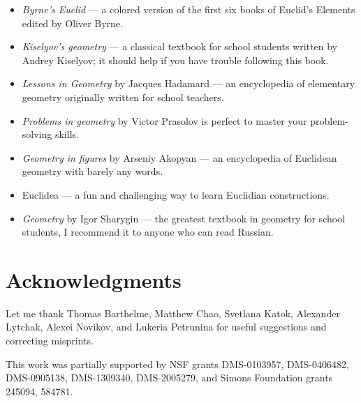\begin{itemize}
\item \emph{Byrne's Euclid} \cite{byrne} --- a colored version of the first six books of Euclid's Elements edited by Oliver Byrne. 

\item \emph{Kiselyov's geometry} \cite{kiselev} ---
a classical textbook for school students written by Andrey Kiselyov; it should help if you have trouble following this book.

\item \emph{Lessons in Geometry} by Jacques Hadamard \cite{hadamard} --- an encyclopedia of elementary geometry originally written for school teachers.



\item \emph{Problems in geometry} by Victor Prasolov\cite{prasolov}  is perfect to master your problem-solving skills.

\item \emph{Geometry in figures} by Arseniy Akopyan \cite{akopyan} --- an encyclopedia of Euclidean geometry with barely any words.

\item Euclidea \cite{euclidea} --- a fun and challenging way to learn Euclidian constructions.
 
\item \emph{Geometry} by Igor Sharygin \cite{sharygin} --- the greatest textbook in geometry for school students, I recommend it to anyone who can read Russian.

\end{itemize}

\section{Acknowledgments}

{\sloppy

Let me thank 
Thomas Barthelme,
Matthew Chao, 
Svetlana Katok, 
Alexander Lytchak,
Alexei Novikov,
and Lukeria Petrunina
for useful suggestions and correcting misprints.

This work was partially supported by
NSF grants
DMS-0103957,
DMS-0406482,
DMS-0905138,
DMS-1309340,
DMS-2005279,
and Simons Foundation grants 
245094, 584781.

}
